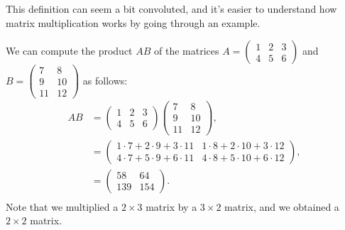 \documentclass{ximera}
\begin{document}
This definition can seem a bit convoluted, and it's easier to understand how matrix multiplication works by going through an example.

\begin{example}
We can compute the product $AB$ of the matrices $A = \left(\begin{array}{ccc}1&2&3\\4&5&6\end{array}\right)$ and $B=\left(\begin{array}{cc}7&8\\9&10\\11&12\end{array}\right)$ as follows:
\begin{align*}
AB &= \left(\begin{array}{ccc}1&2&3\\4&5&6\end{array}\right)\left(\begin{array}{cc}7&8\\9&10\\11&12\end{array}\right),\\
&= \left(\begin{array}{cc}1\cdot 7+ 2\cdot 9 + 3\cdot 11 & 1\cdot 8+ 2\cdot 10 + 3\cdot 12\\
4\cdot 7+ 5\cdot 9 + 6\cdot 11 & 4\cdot 8+ 5\cdot 10 + 6\cdot 12\end{array}\right),\\
&= \left(\begin{array}{cc}58 & 64\\
139 & 154\end{array}\right).\\
\end{align*}
Note that we multiplied a $2\times 3$ matrix by a $3\times 2$ matrix, and we obtained a $2\times 2$ matrix.


\end{example}
\end{document}
